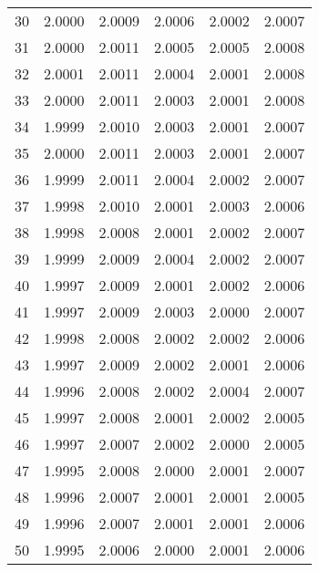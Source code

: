 \begin{tabular}{r*5c}
30 &2.0000 &2.0009 &2.0006 &2.0002 &2.0007\\
31 &2.0000 &2.0011 &2.0005 &2.0005 &2.0008\\
32 &2.0001 &2.0011 &2.0004 &2.0001 &2.0008\\
33 &2.0000 &2.0011 &2.0003 &2.0001 &2.0008\\
34 &1.9999 &2.0010 &2.0003 &2.0001 &2.0007\\
35 &2.0000 &2.0011 &2.0003 &2.0001 &2.0007\\
36 &1.9999 &2.0011 &2.0004 &2.0002 &2.0007\\
37 &1.9998 &2.0010 &2.0001 &2.0003 &2.0006\\
38 &1.9998 &2.0008 &2.0001 &2.0002 &2.0007\\
39 &1.9999 &2.0009 &2.0004 &2.0002 &2.0007\\
40 &1.9997 &2.0009 &2.0001 &2.0002 &2.0006\\
41 &1.9997 &2.0009 &2.0003 &2.0000 &2.0007\\
42 &1.9998 &2.0008 &2.0002 &2.0002 &2.0006\\
43 &1.9997 &2.0009 &2.0002 &2.0001 &2.0006\\
44 &1.9996 &2.0008 &2.0002 &2.0004 &2.0007\\
45 &1.9997 &2.0008 &2.0001 &2.0002 &2.0005\\
46 &1.9997 &2.0007 &2.0002 &2.0000 &2.0005\\
47 &1.9995 &2.0008 &2.0000 &2.0001 &2.0007\\
48 &1.9996 &2.0007 &2.0001 &2.0001 &2.0005\\
49 &1.9996 &2.0007 &2.0001 &2.0001 &2.0006\\
50 &1.9995 &2.0006 &2.0000 &2.0001 &2.0006
\end{tabular}